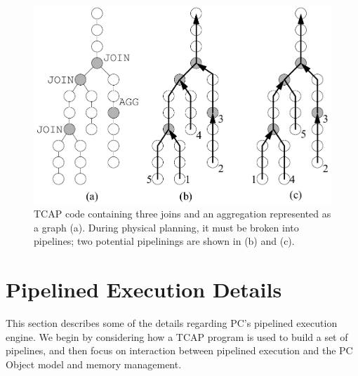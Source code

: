 
\begin{figure}[t]
  \begin{center}
    \includegraphics[width=6in]{DAG}
  \end{center}
\vspace{-10 pt}
  \caption{TCAP code containing three joins and an aggregation represented as a graph (a).  During physical planning, it must be broken into pipelines; two
potential pipelinings are shown in (b) and (c).}
  \label{fig:TCAP}
\end{figure}


\section{Pipelined Execution Details}

This section describes some of the details regarding PC's pipelined execution engine.  We begin by considering how a TCAP
program is used to build a set of pipelines, and then focus on interaction between pipelined execution and the PC Object model
and memory management.

